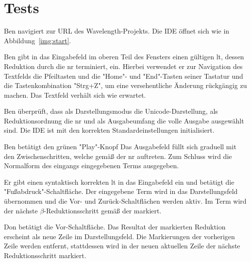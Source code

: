 \documentclass[parskip=full,11pt,twoside]{scrartcl}
\begin{document}
\section{Tests}


{Ben navigiert zur URL des Wavelength-Projekts.}
{Die IDE öffnet sich wie in Abbildung~\ref{img:start}.}

{Ben gibt in das Eingabefeld im oberen Teil des Fensters einen gültigen \gls{lt},
dessen Reduktion durch die \gls{nr} terminiert, ein.
Hierbei verwendet er zur Navigation des Textfelds die Pfeiltasten und die
"Home"- und "End"-Tasten seiner Tastatur und die Tastenkombination "Strg+Z", um eine
versehentliche Änderung rückgängig zu machen.}
{Das Textfeld verhält sich wie erwartet.}

{Ben überprüft, dass als Darstellungsmodus die Unicode-Darstellung, als Reduktionsordnung
die \gls{nr} und als Ausgabeumfang die volle Ausgabe ausgewählt sind.}
{Die IDE ist mit den korrekten Standardeinstellungen initialisiert.}

{Ben betätigt den grünen "Play"-Knopf}
{Das Ausgabefeld füllt sich graduell mit den Zwischenschritten, welche gemäß der \gls{nr} auftreten.
Zum Schluss wird die Normalform des eingangs eingegebenen Terms ausgegeben.}


{Er gibt einen syntaktisch korrekten \gls{lt} in das Eingabefeld ein und betätigt
die "Fußabdruck"-Schaltfläche.}
{Der eingegebene Term wird in das Darstellungsfeld übernommen und die Vor- und
Zurück-Schaltflächen werden aktiv. Im Term wird der nächste $\beta$-Reduktionsschritt
gemäß der  markiert.}

{Don betätigt die Vor-Schaltfläche.}
{Das Resultat der markierten Reduktion erscheint als neue Zeile im Darstellungsfeld.
Die Markierungen der vorherigen Zeile werden entfernt, stattdessen wird in der neuen
aktuellen Zeile der nächste Reduktionsschritt markiert.}
\end{document}
